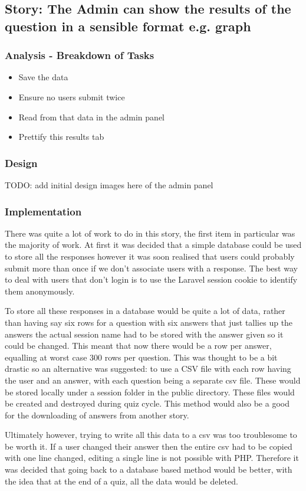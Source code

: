\subsection{Story: The Admin can show the results of the question in a sensible format e.g. graph}
\subsubsection{Analysis - Breakdown of Tasks}
\begin{itemize}
	\item Save the data
	\item Ensure no users submit twice
	\item Read from that data in the admin panel
	\item Prettify this results tab
\end{itemize}
\subsubsection{Design}
TODO: add initial design images here of the admin panel
\subsubsection{Implementation}
There was quite a lot of work to do in this story, the first item in particular was the majority of work. At first it was decided that a simple database could be used to store all the responses however it was soon realised that users could probably submit more than once if we don't associate users with a response. The best way to deal with users that don't login is to use the Laravel session cookie to identify them anonymously.

To store all these responses in a database would be quite a lot of data, rather than having say six rows for a question with six answers that just tallies up the answers the actual session name had to be stored with the answer given so it could be changed. This meant that now there would be a row per answer, equalling at worst case 300 rows per question. This was thought to be a bit drastic so an alternative was suggested: to use a CSV file with each row having the user and an answer, with each question being a separate csv file. These would be stored locally under a session folder in the public directory. These files would be created and destroyed during quiz cycle. This method would also be a good for the downloading of answers from another story. 

Ultimately however, trying to write all this data to a csv was too troublesome to be worth it. If a user changed their answer then the entire csv had to be copied with one line changed, editing a single line is not possible with PHP. Therefore it was decided that going back to a database based method would be better, with the idea that at the end of a quiz, all the data would be deleted.

